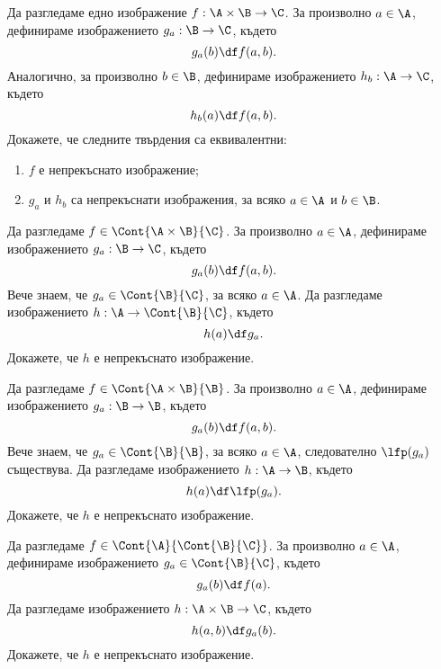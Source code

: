 \begin{problem}
  Да разгледаме едно изображение $f: \A \times \B \to \C$.
  За произволно $a \in \A$, дефинираме изображението $g_a: \B \to \C$, където
  \[g_a(b) \df f(a,b).\]
  Аналогично, за произволно $b \in \B$, дефинираме изображението $h_b: \A \to \C$, където
  \[h_b(a) \df f(a,b).\]
  Докажете, че следните твърдения са еквивалентни:
  \begin{enumerate}[1)]
  \item 
    $f$ е непрекъснато изображение;
  \item
    $g_a$ и $h_b$ са непрекъснати изображения, за всяко $a \in \A$ и $b \in \B$.
  \end{enumerate}
\end{problem}

\begin{problem}
  Да разгледаме $f \in \Cont{\A \times \B}{\C}$.
  За произволно $a \in \A$, дефинираме изображението $g_a: \B \to \C$, където
  \[g_a(b) \df f(a,b).\]
  Вече знаем, че $g_a \in \Cont{\B}{\C}$, за всяко $a \in \A$.
  Да разгледаме изображението $h:\A \to \Cont{\B}{\C}$, където
  \[h(a) \df g_a.\]
  Докажете, че $h$ е непрекъснато изображение.
\end{problem}

\begin{problem}
  Да разгледаме $f \in \Cont{\A \times \B}{\B}$.
  За произволно $a \in \A$, дефинираме изображението $g_a: \B \to \B$, където
  \[g_a(b) \df f(a,b).\]
  Вече знаем, че $g_a \in \Cont{\B}{\B}$, за всяко $a \in \A$,
  следователно $\lfp(g_a)$ съществува.
  Да разгледаме изображението $h:\A \to \B$, където
  \[h(a) \df \lfp(g_a).\]
  Докажете, че $h$ е непрекъснато изображение.
\end{problem}


\begin{problem}
  Да разгледаме $f \in \Cont{\A}{\Cont{\B}{\C}}$.
  За произволно $a \in \A$, дефинираме изображението $g_a \in \Cont{\B}{\C}$, където
  \[g_a(b) \df f(a).\]
  Да разгледаме изображението $h:\A\times \B \to \C$, където
  \[h(a,b) \df g_a(b).\]
  Докажете, че $h$ е непрекъснато изображение.
\end{problem}


